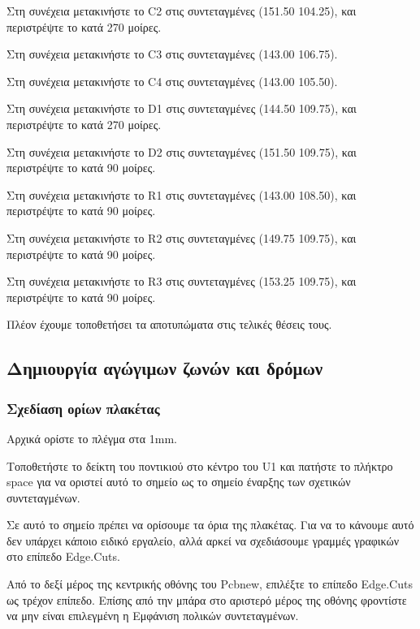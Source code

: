 \documentclass[a4paper]{article}
\begin{document}

Στη συνέχεια μετακινήστε το C2 στις συντεταγμένες (151.50 104.25), και περιστρέψτε το κατά 270 μοίρες. 

Στη συνέχεια μετακινήστε το C3 στις συντεταγμένες (143.00 106.75).

Στη συνέχεια μετακινήστε το C4 στις συντεταγμένες (143.00 105.50).

Στη συνέχεια μετακινήστε το D1 στις συντεταγμένες (144.50 109.75), και περιστρέψτε το κατά 270 μοίρες. 

Στη συνέχεια μετακινήστε το D2 στις συντεταγμένες (151.50 109.75), και περιστρέψτε το κατά  90 μοίρες. 

Στη συνέχεια μετακινήστε το R1 στις συντεταγμένες (143.00 108.50), και περιστρέψτε το κατά  90 μοίρες. 

Στη συνέχεια μετακινήστε το R2 στις συντεταγμένες (149.75 109.75), και περιστρέψτε το κατά  90 μοίρες. 

Στη συνέχεια μετακινήστε το R3 στις συντεταγμένες (153.25 109.75), και περιστρέψτε το κατά  90 μοίρες. 

Πλέον έχουμε τοποθετήσει τα αποτυπώματα στις τελικές θέσεις τους.
 

\subsection{Δημιουργία αγώγιμων ζωνών και δρόμων}

\subsubsection{Σχεδίαση ορίων πλακέτας}
Αρχικά ορίστε το πλέγμα στα 1mm.

Τοποθετήστε το δείκτη του ποντικιού στο κέντρο του U1 και πατήστε το πλήκτρο space για να οριστεί αυτό το σημείο ως το σημείο έναρξης των σχετικών συντεταγμένων.

Σε αυτό το σημείο πρέπει να ορίσουμε τα όρια της πλακέτας. Για να το κάνουμε αυτό δεν υπάρχει κάποιο ειδικό εργαλείο, αλλά αρκεί να σχεδιάσουμε γραμμές γραφικών στο επίπεδο Edge.Cuts.

Από το δεξί μέρος της κεντρικής οθόνης του \textenglish{Pcbnew}, επιλέξτε το επίπεδο Edge.Cuts ως τρέχον επίπεδο. Επίσης από την μπάρα στο αριστερό μέρος της οθόνης φροντίστε να μην είναι επιλεγμένη η Εμφάνιση πολικών συντεταγμένων. %
\end{document}
